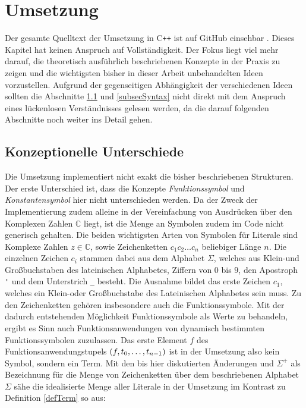 

\chapter{Umsetzung} \label{secKernUmsetzungInCpp}

Der gesamte Quelltext der Umsetzung in C\texttt{++} ist auf GitHub einsehbar \cite{brunizzl2021Jul}. Dieses Kapitel hat keinen Anspruch auf Vollständigkeit. Der Fokus liegt viel mehr darauf, die theoretisch ausführlich beschriebenen Konzepte in der Praxis zu zeigen und die wichtigsten bisher in dieser Arbeit unbehandelten Ideen vorzustellen. Aufgrund der gegenseitigen Abhängigkeit der verschiedenen Ideen sollten die Abschnitte \ref{subsecKonzeptionelleUnterschiede} und \ref{subsecSyntax} nicht direkt mit dem Anspruch eines lückenlosen Verständnisses gelesen werden, da die darauf folgenden Abschnitte noch weiter ins Detail gehen.

\section{Konzeptionelle Unterschiede} \label{subsecKonzeptionelleUnterschiede}
Die Umsetzung implementiert nicht exakt die bisher beschriebenen Strukturen. Der erste Unterschied ist, dass die Konzepte \emph{Funktionssymbol} und \emph{Konstantensymbol} hier nicht unterschieden werden. Da der Zweck der Implementierung zudem alleine in der Vereinfachung von Ausdrücken über den Komplexen Zahlen $\mathbb C$ liegt, ist die Menge an Symbolen zudem im Code nicht generisch gehalten. Die beiden wichtigsten Arten von Symbolen für Literale sind Komplexe Zahlen $z \in \mathbb C$, sowie Zeichenketten $c_1 c_2\dots c_n$ beliebiger Länge $n$. Die einzelnen Zeichen $c_i$ stammen dabei aus dem Alphabet $\Sigma$, welches aus Klein-und Großbuchstaben des lateinischen Alphabetes, Ziffern von $0$ bis $9$, den Apostroph \verb|'| und dem Unterstrich \verb|_| besteht. Die Ausnahme bildet das erste Zeichen $c_1$, welches ein Klein-oder Großbuchstabe des Lateinischen Alphabetes sein muss. Zu den Zeichenketten gehören insbesondere auch die Funktionssymbole. Mit der dadurch entstehenden Möglichkeit Funktionssymbole als Werte zu behandeln, ergibt es Sinn auch Funktionsanwendungen von dynamisch bestimmten Funktionssymbolen zuzulassen. Das erste Element $f$ des Funktionsanwendungstupels $(f, {t}_{0}, \dots, {t}_{n-1})$ ist in der Umsetzung also kein Symbol, sondern ein Term. Mit den bis hier diskutierten Änderungen und $\Sigma^+$ als Bezeichnung für die Menge von Zeichenketten über dem beschriebenen Alphabet $\Sigma$ sähe die idealisierte Menge aller Literale in der Umsetzung im Kontrast zu Definition \ref{defTerm} so aus:

